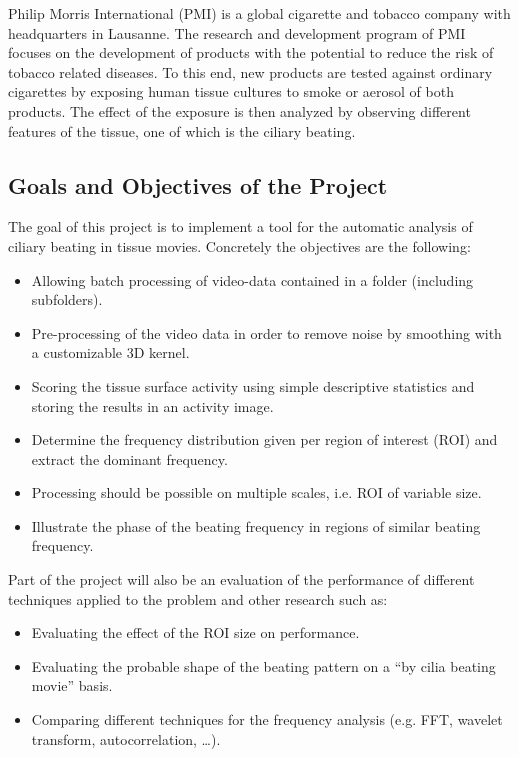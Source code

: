 \documentclass[11pt]{scrartcl}
\begin{document}
Philip Morris International (PMI) is a global cigarette and tobacco company with headquarters in Lausanne. The
research and development program of PMI focuses on the development of products with the potential to reduce
the risk of tobacco related diseases. To this end, new products are tested against ordinary cigarettes by
exposing human tissue cultures to smoke or aerosol of both products. The effect of the exposure is then
analyzed by observing different features of the tissue, one of which is the ciliary beating.


\subsection{Goals and Objectives of the Project}

The goal of this project is to implement a tool for the automatic analysis of ciliary beating in tissue movies. Concretely the objectives are the following:
\begin{itemize}
\item Allowing batch processing of video-data contained in a folder (including subfolders). 
\item Pre-processing of the video data in order to remove noise by smoothing with a customizable 3D kernel.
\item Scoring the tissue surface activity using simple descriptive statistics and storing the results in an
  activity image.
\item Determine the frequency distribution given per region of interest (ROI) and extract the
  dominant frequency.
\item Processing should be possible on multiple scales, i.e. ROI of variable size. 
\item Illustrate the phase of the beating frequency in regions of similar beating frequency.
\end{itemize}

Part of the project will also be an evaluation of the performance of different techniques applied to the problem and other research such as:
\begin{itemize}
\item Evaluating the effect of the ROI size on performance.
\item Evaluating the probable shape of the beating pattern on a “by cilia beating movie” basis.
\item Comparing different techniques for the frequency analysis (e.g. FFT, wavelet transform, autocorrelation, …).
\end{itemize}
\end{document}
